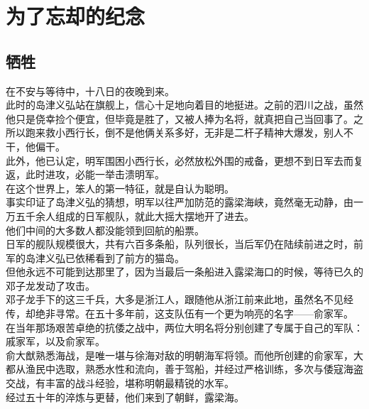 \section{为了忘却的纪念}
\ifnum{}
	\begin{multicols}{\theparacolNo}
\fi
\subsection{牺牲}
在不安与等待中，十八日的夜晚到来。\\

此时的岛津义弘站在旗舰上，信心十足地向着目的地挺进。之前的泗川之战，虽然他只是侥幸捡个便宜，但毕竟是胜了，又被人捧为名将，就真把自己当回事了。之所以跑来救小西行长，倒不是他俩关系多好，无非是二杆子精神大爆发，别人不干，他偏干。\\

此外，他已认定，明军围困小西行长，必然放松外围的戒备，更想不到日军去而复返，此时进攻，必能一举击溃明军。\\

在这个世界上，笨人的第一特征，就是自认为聪明。\\

事实印证了岛津义弘的猜想，明军以往严加防范的露梁海峡，竟然毫无动静，由一万五千余人组成的日军舰队，就此大摇大摆地开了进去。\\

他们中间的大多数人都没能领到回航的船票。\\

日军的舰队规模很大，共有六百多条船，队列很长，当后军仍在陆续前进之时，前军的岛津义弘已依稀看到了前方的猫岛。\\

但他永远不可能到达那里了，因为当最后一条船进入露梁海口的时候，等待已久的邓子龙发动了攻击。\\

邓子龙手下的这三千兵，大多是浙江人，跟随他从浙江前来此地，虽然名不见经传，却绝非寻常。在五十多年前，这支队伍有一个更为响亮的名字——俞家军。\\

在当年那场艰苦卓绝的抗倭之战中，两位大明名将分别创建了专属于自己的军队：戚家军，以及俞家军。\\

俞大猷熟悉海战，是唯一堪与徐海对敌的明朝海军将领。而他所创建的俞家军，大都从渔民中选取，熟悉水性和流向，善于驾船，并经过严格训练，多次与倭寇海盗交战，有丰富的战斗经验，堪称明朝最精锐的水军。\\

经过五十年的淬炼与更替，他们来到了朝鲜，露梁海。\\


\end{multicols}
